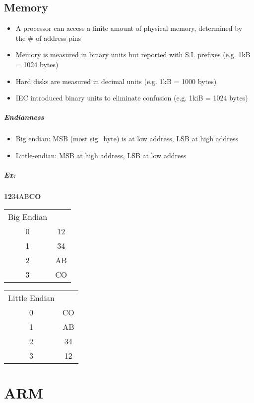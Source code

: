   \section{Memory}
    \begin{itemize}
      \item A processor can access a finite amount of physical memory,
      determined by the \# of address pins
      \item Memory is measured in binary units but reported with S.I. prefixes
      (e.g. 1kB = 1024 bytes)
      \item Hard disks are measured in decimal units (e.g. 1kB = 1000 bytes)
      \item IEC introduced binary units to eliminate confusion (e.g. 1kiB = 1024
      bytes)
    \end{itemize}
    \paragraph{Endianness}
    \begin{itemize}
      \item Big endian: MSB (most sig.\ byte) is at low address, LSB at high
      address
      \item Little-endian: MSB at high address, LSB at low address
    \end{itemize}
    \paragraph{Ex:} \textbf{12}34AB\textbf{CO}
    \begin{center}
      \begin{tabular}{c c}
        Big Endian &  \\
        0 & 12 \\
        1 & 34 \\
        2 & AB \\
        3 & CO \\
      \end{tabular}
      \begin{tabular}{c c}
        Little Endian & \\
        0 & CO \\
        1 & AB \\
        2 & 34 \\
        3 & 12 \\
      \end{tabular}
    \end{center}
\chapter{ARM}
